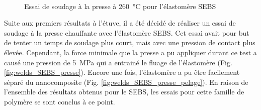 \begin{figure}[h]
	\centering
	 \qquad
	 \\
	\caption{Essai de soudage dans une étuve sous vide à \SI{260}{\celsius} pour l'élastomère SEBS}
	
	\label{fig:etuve_SEBS}
	\centering
	 \qquad
	\caption{Essai de soudage à la presse à \SI{260}{\celsius} pour l'élastomère SEBS}
	\label{fig:presse_SEBS}
\end{figure}

Suite aux premiers résultats à l'étuve, il a été décidé de réaliser un essai de soudage à la presse chauffante avec l'élastomère SEBS. 
Cet essai avait pour but de tenter un temps de soudage plus court, mais avec une pression de contact plus élevée. 
Cependant, la force minimale que la presse a pu appliquer durant ce test a causé une pression de \SI{5}{\mega\pascal} qui a entrainé le fluage de l'élastomère (Fig. \ref{fig:welds_SEBS_presse}). 
Encore une fois, l'élastomère a pu être facilement séparé du nanocomposite (Fig. \ref{fig:welds_SEBS_presse_pelage}). 
En raison de l'ensemble des résultats obtenus pour le SEBS, les essais pour cette famille de polymère se sont conclus à ce point. 

